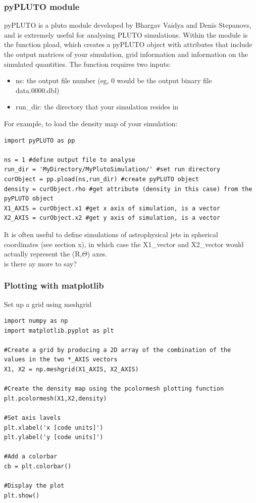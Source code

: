 \documentclass[12pt,a4paper]{report}
\begin{document}
\subsubsection{pyPLUTO module}
pyPLUTO is a pluto module developed by Bhargav Vaidya and Denis Stepanovs, and is extremely useful for analysing PLUTO simulations. Within the module is the function pload, which creates a pyPLUTO object with attributes that include the output matrices of your simulation, grid information and information on the simulated quantities. The function requires two inputs:
\begin{itemize}
\item ns: the output file number (eg, 0 would be the output binary file data.0000.dbl)
\item run\_dir: the directory that your simulation resides in
\end{itemize}
For example, to load the density map of your simulation:
\begin{lstlisting}
import pyPLUTO as pp

ns = 1 #define output file to analyse
run_dir = 'MyDirectory/MyPlutoSimulation/' #set run directory
curObject = pp.pload(ns,run_dir) #create pyPLUTO object
density = curObject.rho #get attribute (density in this case) from the pyPLUTO object
X1_AXIS = curObject.x1 #get x axis of simulation, is a vector
X2_AXIS = curObject.x2 #get y axis of simulation, is a vector
\end{lstlisting}
It is often useful to define simulations of astrophysical jets in spherical coordinates (see section x), in which case the X1\_vector and X2\_vector would actually represent the (R,$\Theta$) axes.\\
is there ay more to say?

\subsubsection{Plotting with matplotlib}

Set up a grid using meshgrid
\begin{lstlisting}
import numpy as np
import matplotlib.pyplot as plt

#Create a grid by producing a 2D array of the combination of the values in the two *_AXIS vectors
X1, X2 = np.meshgrid(X1_AXIS, X2_AXIS)

#Create the density map using the pcolormesh plotting function 
plt.pcolormesh(X1,X2,density)

#Set axis lavels
plt.xlabel('x [code units]')
plt.ylabel('y [code units]')

#Add a colorbar
cb = plt.colorbar()

#Display the plot
plt.show()
\end{lstlisting}
\end{document}

